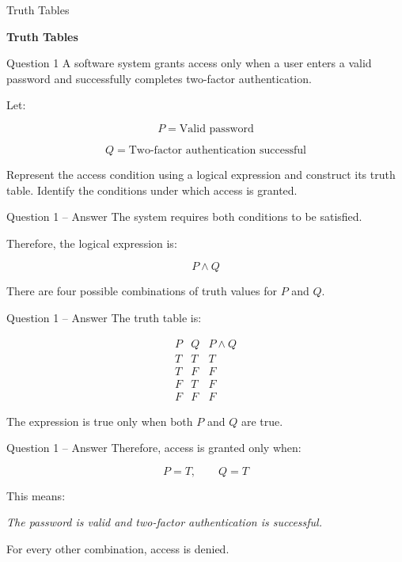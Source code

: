 \begin{frame}{Truth Tables}
\begin{center}
\vspace{1.5cm}
{\Huge\textbf{Truth Tables}}
\end{center}
\end{frame}


\begin{frame}{Question 1}
A software system grants access only when a user enters a valid password
and successfully completes two-factor authentication.

Let:

$$
P = \text{Valid password}
$$

$$
Q = \text{Two-factor authentication successful}
$$

Represent the access condition using a logical expression and construct its
truth table. Identify the conditions under which access is granted.
\end{frame}

\begin{frame}{Question 1 -- Answer}
The system requires both conditions to be satisfied.

Therefore, the logical expression is:

$$
P \land Q
$$

There are four possible combinations of truth values for $P$ and $Q$.
\end{frame}

\begin{frame}{Question 1 -- Answer}
The truth table is:

$$
\begin{matrix}
P & Q & P\land Q \\
T & T & T \\
T & F & F \\
F & T & F \\
F & F & F
\end{matrix}
$$

The expression is true only when both $P$ and $Q$ are true.
\end{frame}

\begin{frame}{Question 1 -- Answer}
Therefore, access is granted only when:

$$
P=T,\qquad Q=T
$$

This means:

\begin{center}
\textit{The password is valid and two-factor authentication is successful.}
\end{center}

For every other combination, access is denied.
\end{frame}

